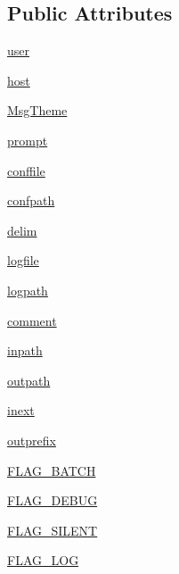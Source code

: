 \subsection*{\-Public \-Attributes}
\begin{DoxyCompactItemize}
\item 
\hyperlink{classpipeline_1_1_pipeline_a372247804622ee3c473640452d2bee8d}{user}
\item 
\hyperlink{classpipeline_1_1_pipeline_afa460d0a63775493a8835233557c8960}{host}
\item 
\hyperlink{classpipeline_1_1_pipeline_aec602b83cddbb7377f93854974143f7f}{\-Msg\-Theme}
\item 
\hyperlink{classpipeline_1_1_pipeline_afda469d549f3084efc0df04ceecd1ad5}{prompt}
\item 
\hyperlink{classpipeline_1_1_pipeline_a209c8adfeaecdc25a006016a64ecdb95}{conffile}
\item 
\hyperlink{classpipeline_1_1_pipeline_a1a185fd9980da0b54b8c5552ceaefae1}{confpath}
\item 
\hyperlink{classpipeline_1_1_pipeline_ad3cc484877090fc3eb91eff1c4c6470e}{delim}
\item 
\hyperlink{classpipeline_1_1_pipeline_a52ff684ce577e3353efff7558fc90933}{logfile}
\item 
\hyperlink{classpipeline_1_1_pipeline_a118f80f0ddd2beb69068c9da05a23f6b}{logpath}
\item 
\hyperlink{classpipeline_1_1_pipeline_a3cec058fa82045588fe8b26e2f4eaed8}{comment}
\item 
\hyperlink{classpipeline_1_1_pipeline_a608454c2b0019a3a29d1385bfa46bc52}{inpath}
\item 
\hyperlink{classpipeline_1_1_pipeline_a2c265b3d2e076fbd794dac0c79d9964d}{outpath}
\item 
\hyperlink{classpipeline_1_1_pipeline_acbcba83d19ac17e952468942e10e17b5}{inext}
\item 
\hyperlink{classpipeline_1_1_pipeline_a8c15d50241eaec14cdf166cdd1fd1f21}{outprefix}
\item 
\hyperlink{classpipeline_1_1_pipeline_a33db6829062950146bdaa879e1a5d4af}{\-F\-L\-A\-G\-\_\-\-B\-A\-T\-C\-H}
\item 
\hyperlink{classpipeline_1_1_pipeline_afba496011d664deb15adce4f8ffa7998}{\-F\-L\-A\-G\-\_\-\-D\-E\-B\-U\-G}
\item 
\hyperlink{classpipeline_1_1_pipeline_a08292fcc6c515e2e72d20714a73ef07e}{\-F\-L\-A\-G\-\_\-\-S\-I\-L\-E\-N\-T}
\item 
\hyperlink{classpipeline_1_1_pipeline_a326f5cc89f5ce31f974a82fbe1d58f1c}{\-F\-L\-A\-G\-\_\-\-L\-O\-G}

\end{DoxyCompactItemize}
